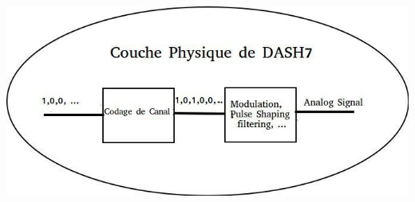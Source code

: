 \documentclass[8pt]{beamer}
\newcommand{\1}{\mathbbm 1}
\begin{document}
\begin{frame}
%
\end{frame}

\begin{frame}
\begin{center}
\includegraphics[scale=0.48]{figures/physique.jpg}
\end{center}

\end{frame}
\end{document}
